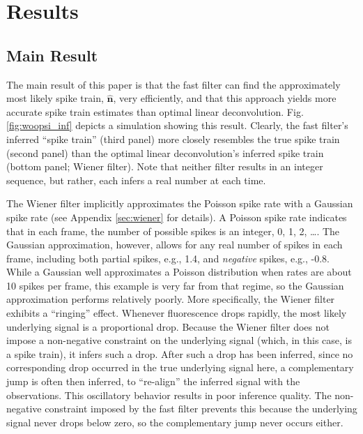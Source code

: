 \documentclass{article}
\providecommand{\ve}[1]{\boldsymbol{#1}}
\newcommand{\hbn}{\widehat{\ve{n}}}
\newcommand{\foopsi}{fast }
\begin{document}
\section{Results} \label{sec:results}

\subsection{Main Result} \label{sec:main}

The main result of this paper is that the \foopsi filter can find the approximately most likely spike train, $\hbn$, very efficiently, and that this approach yields more accurate spike train estimates than optimal linear deconvolution.  Fig. \ref{fig:woopsi_inf} depicts a simulation showing this result. Clearly, the \foopsi filter's inferred ``spike train'' (third panel) more closely resembles the true spike train (second panel) than the optimal linear deconvolution's inferred spike train (bottom panel; Wiener filter).  Note that neither filter results in an integer sequence, but rather, each infers a real number at each time.

The Wiener filter implicitly approximates the Poisson spike rate with a Gaussian spike rate (see Appendix \ref{sec:wiener} for details).  A Poisson spike rate indicates that in each frame, the number of possible spikes is an integer, 0, 1, 2, \ldots.  The Gaussian approximation, however, allows for any real number of spikes in each frame, including both partial spikes, e.g., 1.4, and \emph{negative} spikes, e.g., -0.8.  While a Gaussian well approximates a Poisson distribution when rates are about 10 spikes per frame, this example is very far from that regime, so the Gaussian approximation performs relatively poorly.  More specifically, the Wiener filter exhibits a ``ringing'' effect.  Whenever fluorescence drops rapidly, the most likely underlying signal is a proportional drop.  Because the Wiener filter does not impose a non-negative constraint on the underlying signal (which, in this case, is a spike train), it infers such a drop.  After such a drop has been inferred, since no corresponding drop occurred in the true underlying signal here, a complementary jump is often then inferred, to ``re-align'' the inferred signal with the observations.  This oscillatory behavior results in poor inference quality. The non-negative constraint imposed by the \foopsi filter prevents this because the underlying signal never drops below zero, so the complementary jump never occurs either.

\end{document}
